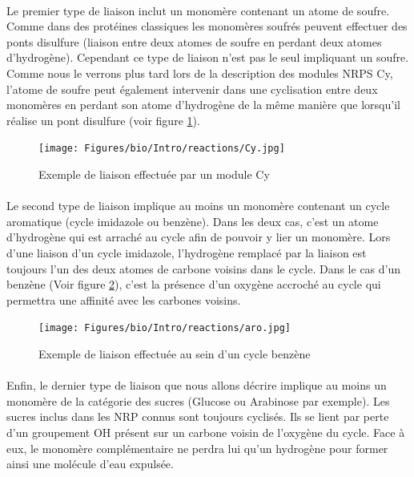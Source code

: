 \documentclass[12pt,french,twoside]{report}
\begin{document}
\paragraph{}Le premier type de liaison inclut un monomère contenant un atome de soufre.
Comme dans des protéines classiques les monomères soufrés peuvent effectuer des ponts disulfure (liaison entre deux atomes de soufre en perdant deux atomes d'hydrogène).
Cependant ce type de liaison n'est pas le seul impliquant un soufre.
Comme nous le verrons plus tard lors de la description des modules NRPS Cy, l'atome de soufre peut également intervenir dans une cyclisation entre deux monomères en perdant son atome d'hydrogène de la même manière que lorsqu'il réalise un pont disulfure (voir figure \ref{Cy_link}).

\begin{figure}[h!]
  \begin{center}
    \texttt{[image: Figures/bio/Intro/reactions/Cy.jpg]}
    \caption{\label{Cy_link}Exemple de liaison effectuée par un module Cy}
  \end{center}
\end{figure}

\paragraph{}Le second type de liaison implique au moins un monomère contenant un cycle aromatique (cycle imidazole ou benzène).
Dans les deux cas, c'est un atome d'hydrogène qui est arraché au cycle afin de pouvoir y lier un monomère.
Lors d'une liaison d'un cycle imidazole, l'hydrogène remplacé par la liaison est toujours l'un des deux atomes de carbone voisins dans le cycle.
Dans le cas d'un benzène (Voir figure \ref{benzene}), c'est la présence d'un oxygène accroché au cycle qui permettra une affinité avec les carbones voisins.

\begin{figure}[h!]
  \begin{center}
    \texttt{[image: Figures/bio/Intro/reactions/aro.jpg]}
    \caption{\label{benzene}Exemple de liaison effectuée au sein d'un cycle benzène}
  \end{center}
\end{figure}

\paragraph{}Enfin, le dernier type de liaison que nous allons décrire implique au moins un monomère de la catégorie des sucres (Glucose ou Arabinose par exemple).
Les sucres inclus dans les NRP connus sont toujours cyclisés.
Ils se lient par perte d'un groupement OH présent sur un carbone voisin de l'oxygène du cycle.
Face à eux, le monomère complémentaire ne perdra lui qu'un hydrogène pour former ainsi une molécule d'eau expulsée.
\end{document}
